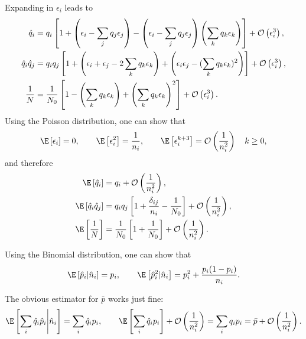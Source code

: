 \documentclass[12pt]{article}
\begin{document}
Expanding in $\epsilon_i$ leads to
%
\begin{equation}\label{eq:expandeps}
  \begin{aligned}
    \hat{q}_i &= q_i\left [  1 + \left ( \epsilon_i-\sum_jq_j\epsilon_j \right ) -  \left ( \epsilon_i-\sum_jq_j\epsilon_j \right ) \left ( \sum_kq_k\epsilon_k \right )  \right ] +\mathcal{O}\left ( \epsilon_i^3 \right ), \\
    \hat{q}_i\hat{q}_j &= q_iq_j\left [  1 + \left ( \epsilon_i+\epsilon_j-2\sum_kq_k\epsilon_k \right ) +  \left ( \epsilon_i\epsilon_j-(\sum_kq_k\epsilon_k)^2 \right )  \right ]  +\mathcal{O}\left ( \epsilon_i^3 \right ), \\
    \frac{1}{N} &= \frac{1}{N_0} \left [  1 - \left ( \sum_kq_k\epsilon_k \right ) +  \left ( \sum_kq_k\epsilon_k \right )^2  \right ] +\mathcal{O}\left ( \epsilon_i^3 \right ).
  \end{aligned}
\end{equation}
%
Using the Poisson distribution, one can show that
%
\begin{equation}\label{eq:expeps}
    \E\brk{\epsilon_i} = 0, \qquad
    \E\brk{\epsilon_i^2} = \frac{1}{n_i}, \qquad
    \E\brk{\epsilon_i^{k+3}} = \CO\prn{\frac{1}{n_i^2}} \quad k\geq0,
\end{equation}
%
and therefore
%
\begin{equation}\label{eq:expandepsex}
  \begin{aligned}
    \E\brk{\hat{q}_i} &= q_i + \CO\prn{\frac{1}{n_i^2}}, \\
    \E\brk{\hat{q}_i\hat{q}_j} &= q_iq_j\brk{ 1 + \frac{\delta_{ij}}{n_i} -  \frac{1}{N_0}}  + \CO\prn{\frac{1}{n_i^2}}, \\
    \E\brk{\frac{1}{N}} &= \frac{1}{N_0} \brk{ 1  +  \frac{1}{N_0} } + \CO\prn{\frac{1}{n_i^2}}.
  \end{aligned}
\end{equation}
%

Using the Binomial distribution, one can show that
%
\begin{equation}\label{eq:expi}
  \E\brk{\hat{p}_i|\hat{n}_i} = p_i, \qquad
  \E\brk{\hat{p}_i^2|\hat{n}_i} = p_i^2 + \frac{p_i(1-p_i)}{n_i}.
\end{equation}
%

The obvious estimator for $\bar{p}$ works just fine:
%
\begin{equation}\label{eq:pbarest}
  \E\brk{\sum_i\hat{q}_i\hat{p}_i\middle|\hat{n}_i} = \sum_i \hat{q}_ip_i,
  \qquad
  \E\brk{\sum_i\hat{q}_ip_i} + \CO\prn{\frac{1}{n_i^2}} = \sum_iq_ip_i = \bar{p} + \CO\prn{\frac{1}{n_i^2}}.
\end{equation}
%
\end{document}

